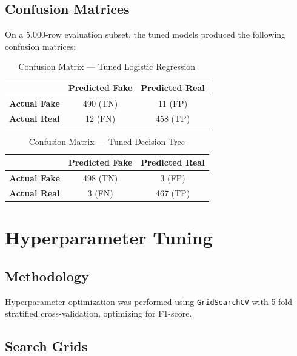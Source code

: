 \documentclass[12pt, a4paper]{article}
\begin{document}
\subsection{Confusion Matrices}
On a 5,000-row evaluation subset, the tuned models produced the following confusion matrices:

\begin{table}[H]
\centering
\caption{Confusion Matrix — Tuned Logistic Regression}
\begin{tabular}{@{}lcc@{}}
\toprule
                    & \textbf{Predicted Fake} & \textbf{Predicted Real} \\
\midrule
\textbf{Actual Fake} & 490 (TN)               & 11 (FP)                \\
\textbf{Actual Real} & 12 (FN)                & 458 (TP)               \\
\bottomrule
\end{tabular}
\end{table}

\begin{table}[H]
\centering
\caption{Confusion Matrix — Tuned Decision Tree}
\begin{tabular}{@{}lcc@{}}
\toprule
                    & \textbf{Predicted Fake} & \textbf{Predicted Real} \\
\midrule
\textbf{Actual Fake} & 498 (TN)               & 3 (FP)                 \\
\textbf{Actual Real} & 3 (FN)                 & 467 (TP)               \\
\bottomrule
\end{tabular}
\end{table}

\section{Hyperparameter Tuning}

\subsection{Methodology}
Hyperparameter optimization was performed using \texttt{GridSearchCV} with 5-fold stratified cross-validation, optimizing for F1-score.

\subsection{Search Grids}
\end{document}
